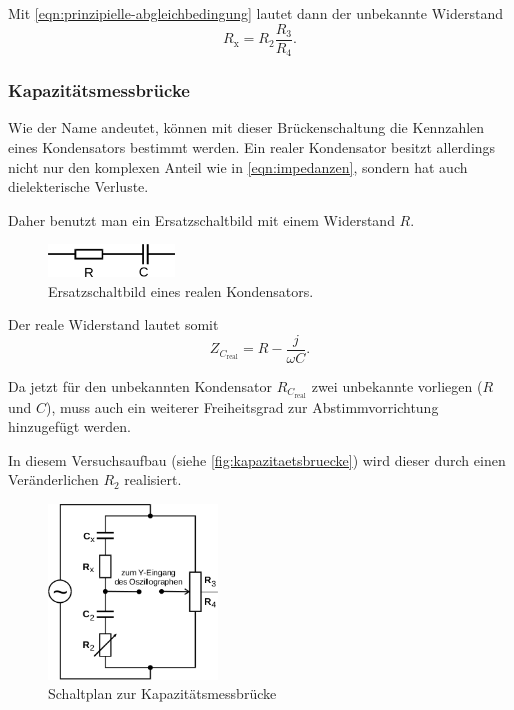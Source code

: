 Mit \autoref{eqn:prinzipielle-abgleichbedingung} lautet dann der unbekannte Widerstand
\begin{equation}
	R_\text{x} = R_2 \frac{R_3}{R_4}.
	\label{eqn:wheatstone-rx}
\end{equation}

\subsubsection{Kapazitätsmessbrücke}
\label{sec:theorie-kapazitaetsmessbruecke}

Wie der Name andeutet, können mit dieser Brückenschaltung die Kennzahlen eines Kondensators bestimmt werden.
Ein realer Kondensator besitzt allerdings nicht nur den komplexen Anteil wie in \autoref{eqn:impedanzen},
sondern hat auch dielekterische Verluste.

Daher benutzt man ein Ersatzschaltbild mit einem Widerstand $R$.
\begin{figure}[H]
	\centering
	\includegraphics[width=0.3\textwidth]{bilder/ersatz-kapazitaet.png}
	\caption{Ersatzschaltbild eines realen Kondensators. \cite{sample}}
	\label{fig:ersatz-kondensator}
\end{figure}
Der reale Widerstand lautet somit
\begin{equation}
	Z_{C_\text{real}} = R - \frac{j}{\omega C}.
	\label{eqn:realer-wderstand-kondensator}
\end{equation}

Da jetzt für den unbekannten Kondensator $R_{C_\text{real}}$ zwei unbekannte vorliegen ($R$ und $C$), muss 
auch ein weiterer Freiheitsgrad zur Abstimmvorrichtung hinzugefügt werden.

In diesem Versuchsaufbau (siehe \autoref{fig:kapazitaetsbruecke}) wird dieser durch einen Veränderlichen $R_2$
realisiert.
\begin{figure}[H]
	\centering
	\includegraphics[width=0.4\textwidth]{bilder/kapazitaetsbruecke.png}
	\caption{Schaltplan zur Kapazitätsmessbrücke \cite{sample}}
	\label{fig:kapazitaetsbruecke}
\end{figure}

